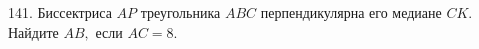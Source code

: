 141. Биссектриса $AP$ треугольника $ABC$ перпендикулярна его медиане $CK.$ Найдите $AB,$ если $AC=8.$\\

